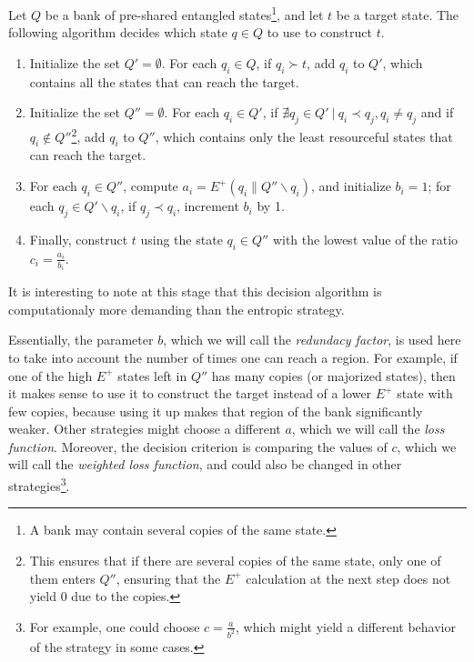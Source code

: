 \begin{definition} \label{strat:unique_entropy}
    Let $Q$ be a bank of pre-shared entangled states\footnote{A bank may contain several copies of the same state.}, and let $t$ be a target state. The following algorithm decides which state $q \in Q$ to use to construct $t$.
    \begin{enumerate}
        \item Initialize the set $Q' = \emptyset$. For each $q_i \in Q$, if $q_i \succ t$, add $q_i$ to $Q'$, which contains all the states that can reach the target.
        \item Initialize the set $Q'' = \emptyset$. For each $q_i \in Q'$, if $\nexists q_j \in Q' \: | \: q_i \prec q_j, q_i \neq q_j$ and if $q_i \notin Q''$\footnote{This ensures that if there are several copies of the same state, only one of them enters $Q''$, ensuring that the $E^+$ calculation at the next step does not yield 0 due to the copies.}, add $q_i$ to $Q''$, which contains only the least resourceful states that can reach the target.
        \item For each $q_i \in Q''$, compute $a_i = E^+(q_i \parallel Q'' \backslash q_i)$, and initialize $b_i = 1$; for each $q_j \in Q' \backslash q_i$, if $q_j \prec q_i$, increment $b_i$ by 1. \label{step:volume}
        \item Finally, construct $t$ using the state $q_i \in Q''$ with the lowest value of the ratio $c_i = \frac{a_i}{b_i}$.
    \end{enumerate}
\end{definition}

\noindent It is interesting to note at this stage that this decision algorithm is computationaly more demanding than the entropic strategy.

Essentially, the parameter $b$, which we will call the \textit{redundacy factor}, is used here to take into account the number of times one can reach a region. For example, if one of the high $E^+$ states left in $Q''$ has many copies (or majorized states), then it makes sense to use it to construct the target instead of a lower $E^+$ state with few copies, because using it up makes that region of the bank significantly weaker. Other strategies might choose a different $a$, which we will call the \textit{loss function}. Moreover, the decision criterion is comparing the values of $c$, which we will call the \textit{weighted loss function}, and could also be changed in other strategies\footnote{For example, one could choose $c = \frac{a}{b^2}$, which might yield a different behavior of the strategy in some cases.}.%

